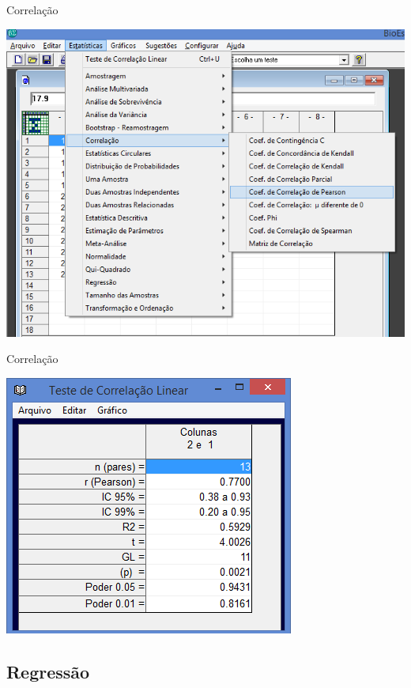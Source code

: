 \documentclass{beamer}
\begin{document}
\begin{frame}{Correlação}
  \begin{center}
    \includegraphics[height=0.9\textheight]{selecao_correlacao}
  \end{center}
\end{frame}

\begin{frame}{Correlação}
  \begin{center}
    \includegraphics[height=0.9\textheight]{resultado_correlacao}
  \end{center}
\end{frame}


\subsection{Regressão}
\end{document}
